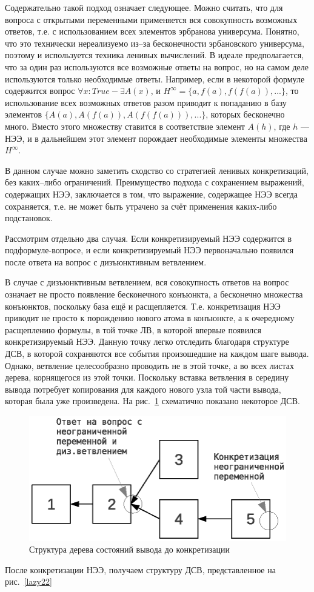 Содержательно такой подход означает следующее. Можно считать, что для вопроса с открытыми переменными применяется вся совокупность возможных ответов, т.е. с использованием всех элементов эрбранова универсума. Понятно, что это технически нереализуемо из--за бесконечности эрбановского универсума, поэтому и используется техника ленивых вычислений. В идеале предполагается, что за один раз используются все возможные ответы на вопрос, но на самом деле используются только необходимые ответы. Например, если в некоторой формуле содержится вопрос $\forall x: True  - \exists A(x)$, и $H^{\infty}= \{a, f(a), f(f(a)), ...\}$, то использование всех возможных ответов разом приводит к попаданию в базу элементов $\{A(a), A(f(a)), A(f(f(a))), ...\}$, которых бесконечно много. Вместо этого множеству ставится в соответствие элемент $A(h)$, где $h$ --- НЭЭ, и в дальнейшем этот элемент порождает необходимые элементы множества $H^{\infty}$.

В данном случае можно заметить сходство со стратегией ленивых конкретизаций, без каких--либо ограничений. Преимущество подхода с сохранением выражений, содержащих НЭЭ, заключается в том, что выражение, содержащее НЭЭ всегда сохраняется, т.е. не может быть утрачено за счёт применения каких-либо подстановок.

Рассмотрим отдельно два случая. Если конкретизируемый НЭЭ содержится в подформуле-вопросе, и если конкретизируемый НЭЭ первоначально появился после ответа на вопрос с дизъюнктивным ветвлением.

В случае с дизъюнктивным ветвлением, вся совокупность ответов на вопрос означает не просто появление бесконечного конъюнкта, а бесконечно множества конъюнктов, поскольку база ещё и расщепляется. Т.е. конкретизация НЭЭ приводит не просто к порождению нового атома в конъюнкте, а к очередному расщеплению формулы, в той точке ЛВ, в которой впервые появился конкретизируемый НЭЭ. Данную точку легко отследить благодаря структуре ДСВ, в которой сохраняются все события произошедшие на каждом шаге вывода. Однако, ветвление целесообразно проводить не в этой точке, а во всех листах дерева, корнящегося из этой точки. Поскольку вставка ветвления в середину вывода потребует копирования для каждого нового узла той части вывода, которая была уже произведена.  На рис.~\ref{lazy21} схематично показано некоторое ДСВ.
\begin{figure}[h]
	\centering
	\includegraphics[width=0.5\linewidth]{pics/Lazy21.eps}
	\caption{Структура дерева состояний вывода до конкретизации}
	\label{lazy21}
\end{figure}
После конкретизации НЭЭ, получаем структуру ДСВ, представленное на рис.~\ref{lazy22}

